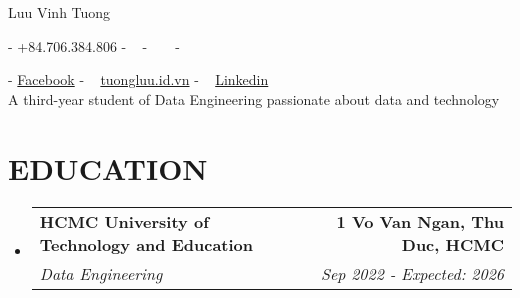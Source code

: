 \documentclass[letterpaper,11pt]{article}
\makeatletter
\newcommand{\resumeSubheading}[4]{
  \vspace{-2pt}\item
    \begin{tabular*}{1.0\textwidth}[t]{l@{\extracolsep{\fill}}r}
      \textbf{\large#1} & \textbf{\small #2} \\
      \textit{\large#3} & \textit{\small #4} \\
      
    \end{tabular*}\vspace{-7pt}
}
\newcommand{\resumeSubHeadingListStart}{\begin{itemize}[leftmargin=0.0in, label={}]}
\newcommand{\resumeSubHeadingListEnd}{\end{itemize}}
\makeatother
\begin{document}


\begin{center}
    {\vspace{15pt}}
    {\huge Luu Vinh Tuong} \\ \vspace{5pt} 
    
    \small{-}
    {+84.706.384.806 }
    \small{-}
    \href{mailto:tuongst689@gmail.com}{\color{blue}{tuongst689@gmail.com}} ~ 
    \small{-} ~
    \href{github.com/Wal-Liu}{ \color{blue}{Github}} ~
    \small{-}
        
    \small{-}
    \href{https://www.facebook.com/vinhtuong.luu.1}{\color{blue}Facebook}
    \small{-} ~
    \href{https://tuongluu.id.vn/}{\color{blue}tuongluu.id.vn}
    \small{-} ~
    \href{https://www.linkedin.com/in/vinhtuongluu689}{\color{blue}Linkedin}\\
    {A third-year student of Data Engineering passionate  about data and technology} \\
    \vspace{10pt}

\end{center}

\section{\color{airforceblue}EDUCATION}
  \resumeSubHeadingListStart
    \resumeSubheading
      {HCMC University of Technology and Education}{1 Vo Van Ngan, Thu Duc, HCMC}
      {Data Engineering}{Sep 2022 - Expected: 2026}
  \resumeSubHeadingListEnd
  \vspace{5pt}

\end{document}
